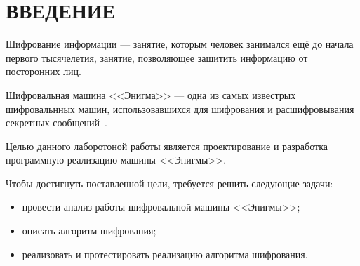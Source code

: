 \chapter*{ВВЕДЕНИЕ}

Шифрование информации --- занятие, которым человек занимался ещё до начала первого тысячелетия, занятие, позволяющее защитить информацию от посторонних лиц. 

Шифровальная машина <<Энигма>> --- одна из самых известрых шифровальнных машин, использовавшихся для шифрования и расшифровывания секретных сообщений~\cite{enigma-1}.

Целью данного лаборотоной работы является проектирование и разработка программную реализацию машины <<Энигмы>>.

Чтобы достигнуть поставленной цели, требуется решить следующие задачи:
\begin{itemize}
	\item провести анализ работы шифровальной машины <<Энигмы>>;
	\item описать алгоритм шифрования;
	\item реализовать и протестировать реализацию алгоритма шифрования.  
\end{itemize}
